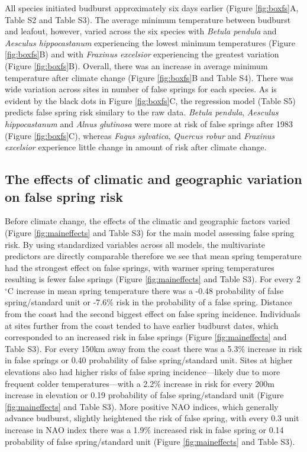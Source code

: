 \documentclass{article}\usepackage[]{graphicx}\usepackage[]{color}
\begin{document}
All species initiated budburst approximately six days earlier (Figure \ref{fig:boxfs}A, Table S2 and Table S3). The average minimum temperature between budburst and leafout, however, varied across the six species with \textit{Betula pendula} and \textit{Aesculus hippocastanum} experiencing the lowest minimum temperatures (Figure \ref{fig:boxfs}B) and with \textit{Fraxinus excelsior} experiencing the greatest variation (Figure \ref{fig:boxfs}B). Overall, there was an increase in average minimum temperature after climate change (Figure \ref{fig:boxfs}B and Table S4). There was wide variation across sites in number of false springs for each species. As is evident by the black dots in Figure \ref{fig:boxfs}C, the regression model (Table S5) predicts false spring risk similary to the raw data. \textit{Betula pendula}, \textit{Aesculus hippocastanum} and \textit{Alnus glutinosa} were more at risk of false springs after 1983 (Figure \ref{fig:boxfs}C), whereas \textit{Fagus sylvatica}, \textit{Quercus robur} and \textit{Fraxinus excelsior} experience little change in amount of risk after climate change.

\subsection*{The effects of climatic and geographic variation on false spring risk}
Before climate change, the effects of the climatic and geographic factors varied (Figure \ref{fig:maineffects} and Table S3) for the main model assessing false spring risk. By using standardized variables across all models, the multivariate predictors are directly comparable therefore we see that mean spring temperature had the strongest effect on false springs, with warmer spring temperatures resulting is fewer false springs (Figure \ref{fig:maineffects} and Table S3). For every 2$^{\circ}$C increase in mean spring temperature there was a -0.48 probability of false spring/standard unit or -7.6\% risk in the probability of a false spring. Distance from the coast had the second biggest effect on false spring incidence. Individuals at sites further from the coast tended to have earlier budburst dates, which corresponded to an increased risk in false springs (Figure \ref{fig:maineffects} and Table S3). For every 150km away from the coast there was a 5.3\% increase in risk in false springs or 0.40 probability of false spring/standard unit. Sites at higher elevations also had higher risks of false spring incidence---likely due to more frequent colder temperatures---with a 2.2\% increase in risk for every 200m increase in elevation or 0.19 probability of false spring/standard unit (Figure \ref{fig:maineffects} and Table S3). More positive NAO indices, which generally advance budburst, slightly heightened the risk of false spring, with every 0.3 unit increase in NAO index there was a 1.9\% increased risk in false spring or 0.14 probability of false spring/standard unit (Figure \ref{fig:maineffects} and Table S3).  
\end{document}
